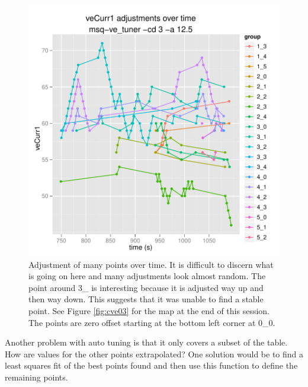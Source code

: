 \documentclass{article}
\begin{document}
\begin{figure}
\center
\includegraphics[scale=0.7]{analyze/cve/cve-many_points-cd3.pdf}
\caption{Adjustment of many points over time.
It is difficult to discern what is going on here and many
adjustments look almost random.  The point around 3\_ is interesting
because it is adjusted way up and then way down.
This suggests that it was unable to find a stable point.
See Figure \ref{fig:cve03} for the map at the end of this session.
The points are zero offset starting at the bottom left corner at
0\_0.
}
\label{fig:cve02}
\end{figure}

Another problem with auto tuning is that it only covers a subset
of the table.
How are values for the other points extrapolated?
One solution would be to find a least squares fit of the best points
found and then use this function to define the remaining points.
\end{document}
